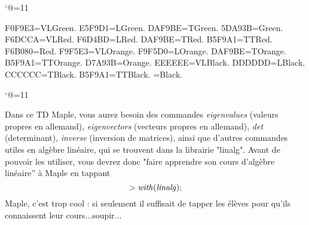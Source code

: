 \catcode`@=11\relax





\DefineRGBcolor F0F9E3=VLGreen.
\DefineRGBcolor E5F9D1=LGreen.
\DefineRGBcolor DAF9BE=TGreen.
\DefineRGBcolor 5DA93B=Green.
\DefineRGBcolor F6DCCA=VLRed.
\DefineRGBcolor F6D4BD=LRed.
\DefineRGBcolor DAF9BE=TRed.
\DefineRGBcolor B5F9A1=TTRed.
\DefineRGBcolor F6B080=Red.
\DefineRGBcolor F9F5E3=VLOrange.
\DefineRGBcolor F9F5D0=LOrange.
\DefineRGBcolor DAF9BE=TOrange.
\DefineRGBcolor B5F9A1=TTOrange.
\DefineRGBcolor D7A93B=Orange.
\DefineRGBcolor EEEEEE=VLBlack.
\DefineRGBcolor DDDDDD=LBlack.
\DefineRGBcolor CCCCCC=TBlack.
\DefineRGBcolor B5F9A1=TTBlack.
=Black.


\catcode`@=11\relax


\def\Maple#1{{\it #1}}%
\vglue-10mm
\bigskip
\bigskip
Dans ce TD Maple, vous aurez besoin des commandes \Maple{eigenvalues} (valeurs propres en allemand), \Maple{eigenvectors} (vecteurs propres en allemand), \Maple{det} (determinant), \Maple{inverse} (inversion de matrices), ainsi que d'autres commandes utiles en alg\`ebre lin\'eaire, qui se trouvent dans la librairie "linalg". Avant de pouvoir les utiliser, vous devrez donc "faire apprendre son cours d'alg\`ebre lin\'eaire'' \`a Maple en tappant
$$
\Maple{>with(linalg);}
$$
Maple, c'est trop cool : si seulement il suffisait de tapper les \'el\`eves pour qu'ils connaissent leur cours...soupir...
\bigskip
{}%
\bigskip
{}%
\smallskip
{}%
\smallskip
{}%
\bigskip
{}%
\bigskip

%
\bigskip
{}%
\smallskip
{}%
\smallskip
{}%
\bigskip
{}%
\smallskip

%
\bigskip
{}%
\bye









